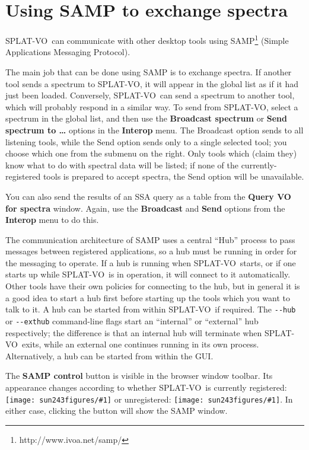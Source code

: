 \documentclass[twoside,11pt]{article}
\newcommand{\htmladdnormallinkfoot}[2]{#1\footnote{#2}}
\newcommand{\htmladdimg}[1]{}
\newcommand{\latexhtml}[2]{#1}
\newcommand{\xlabel}[1]{}
\renewcommand{\_}{\texttt{\symbol{95}}}
\newcommand{\SPLAT}{\textsf{SPLAT-VO}}
\newcommand{\inline}[1]
        {\latexhtml{\texttt{[image: sun243\_figures/\#1]}}
        {\htmladdimg[align=center]{#1.gif}}}
\newcommand{\menuitem}[1]{\textbf{#1}}
\newcommand{\labelitem}[1]{\textbf{#1}}
\begin{document}
\newpage
\section{Using SAMP to exchange spectra\label{interop}\xlabel{interop}}

\SPLAT\ can communicate with other desktop tools using 
\htmladdnormallinkfoot{SAMP}{http://www.ivoa.net/samp/}
(Simple Applications Messaging Protocol).

The main job that can be done using SAMP is to exchange spectra.  If another
tool sends a spectrum to \SPLAT, it will appear in the global list as if it
had just been loaded.  Conversely, \SPLAT\ can send a spectrum to another
tool, which will probably respond in a similar way.  To send from \SPLAT,
select a spectrum in the global list, and then use the \menuitem{Broadcast
  spectrum} or \menuitem{Send spectrum to \ldots} options in the
\menuitem{Interop} menu.  The Broadcast option sends to all listening tools,
while the Send option sends only to a single selected tool; you choose which
one from the submenu on the right.  Only tools which (claim they) know what to
do with spectral data will be listed; if none of the currently-registered
tools is prepared to accept spectra, the Send option will be unavailable.

You can also send the results of an SSA query as a table from the
\labelitem{Query VO for spectra} window.  Again, use the
\menuitem{Broadcast} and \menuitem{Send} options from the
\menuitem{Interop} menu to do this.

The communication architecture of SAMP uses a central ``Hub'' process to pass
messages between registered applications, so a hub must be running in order
for the messaging to operate.  If a hub is running when \SPLAT\ starts, or if
one starts up while \SPLAT\ is in operation, it will connect to it
automatically.  Other tools have their own policies for connecting to the hub,
but in general it is a good idea to start a hub first before starting up the
tools which you want to talk to it.  A hub can be started from within \SPLAT\
if required.  The \verb+--hub+ or \verb+--exthub+ command-line flags start an
``internal'' or ``external'' hub respectively; the difference is that an
internal hub will terminate when \SPLAT\ exits, while an external one
continues running in its own process.  Alternatively, a hub can be started
from within the GUI.

The \labelitem{SAMP control} button is visible in the
browser window toolbar.  Its appearance changes according to whether
\SPLAT\ is currently registered: \inline{sampgo} or
unregistered: \inline{samp}.
In either case, clicking the button will show the SAMP window.
\end{document}

